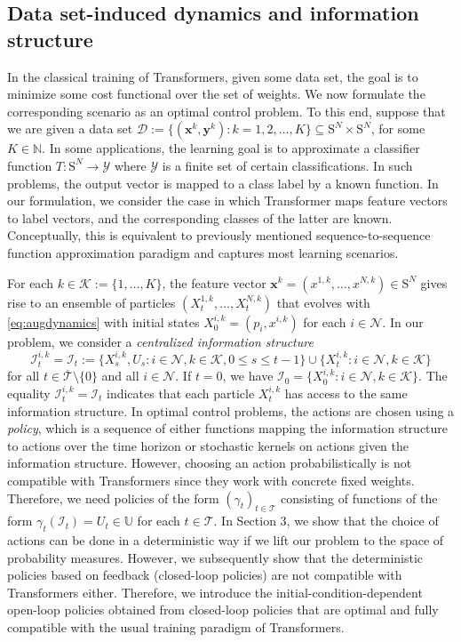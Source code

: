 \documentclass[11pt]{article}
\newcommand{\NN}{\mathbb{N}}
\newcommand{\UU}{\mathbb{U}}
\newcommand{\cD}{\mathcal{D}}
\newcommand{\cI}{\mathcal{I}}
\newcommand{\cK}{\mathcal{K}}
\newcommand{\cN}{\mathcal{N}}
\newcommand{\cT}{\mathcal{T}}
\newcommand{\cY}{\mathcal{Y}}
\begin{document}
\subsection{Data set-induced dynamics and information structure} In the classical training of Transformers, given some data set, the goal is to minimize some cost functional over the set of weights. We now formulate the corresponding scenario as an optimal control problem. To this end, suppose that we are given a data set $\cD := \{(\mathbf{x}^k, \mathbf{y}^k): k=1,2,\ldots,K\}\subseteq\mathrm{S}^N\times\mathrm{S}^N$, for some $K\in\NN$. In some applications, the learning goal is to approximate a classifier function $T:\mathrm{S}^N\to\cY$ where $\cY$ is a finite set of certain classifications. In such problems, the output vector is mapped to a class label by a known function. In our formulation, we consider the case in which Transformer maps feature vectors to label vectors, and the corresponding classes of the latter are known. Conceptually, this is equivalent to previously mentioned sequence-to-sequence function approximation paradigm and captures most learning scenarios.

For each $k\in\cK := \{1,\ldots,K\}$, the feature vector $\mathbf{x}^k = (x^{1,k},\ldots,x^{N,k})\in\mathrm{S}^N$ gives rise to an ensemble of particles $(X_t^{1,k},\ldots,X_t^{N,k})$ that evolves with \eqref{eq:augdynamics} with initial states $X_0^{i,k} = (p_i, x^{i,k})$ for each $i\in\cN$. In our problem, we consider a \emph{centralized information structure}
\begin{equation}
    \cI_t^{i,k} = \cI_t := \{X_s^{i, k}, U_s : i\in\cN, k\in\cK, 0 \leq s \leq t-1\}\cup\{X_t^{i, k} : i\in\cN, k\in\cK\}
\end{equation}
for all $t\in\overline{\cT}\setminus\{0\}$ and all $i\in\cN$. If $t=0$, we have $\cI_0 = \{X_0^{i,k}: i\in\cN, k\in\cK\}$. The equality $\cI_t^{i,k} = \cI_t$ indicates that each particle $X_t^{i,k}$ has access to the same information structure. In optimal control problems, the actions are chosen using a \emph{policy}, which is a sequence of either functions mapping the information structure to actions over the time horizon or stochastic kernels on actions given the information structure. However, choosing an action probabilistically is not compatible with Transformers since they work with concrete fixed weights. Therefore, we need policies of the form $(\gamma_t)_{t\in\cT}$ consisting of functions of the form $\gamma_t(\cI_t) = U_t\in\UU$ for each $t\in\cT$. In Section 3, we show that the choice of actions can be done in a deterministic way if we lift our problem to the space of probability measures. However, we subsequently show that the deterministic policies based on feedback (closed-loop policies) are not compatible with Transformers either. Therefore, we introduce the initial-condition-dependent open-loop policies obtained from closed-loop policies that are optimal and fully compatible with the usual training paradigm of Transformers.
\end{document}
